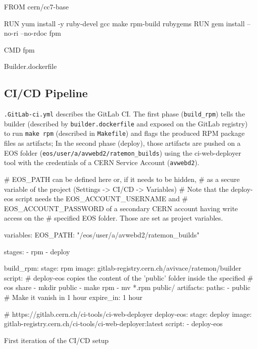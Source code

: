 \begin{listing}[ht]
\begin{yamlcode}
FROM cern/cc7-base

RUN yum install -y ruby-devel gcc make rpm-build rubygems
RUN gem install --no-ri --no-rdoc fpm

CMD fpm
\end{yamlcode}
\caption{Builder.dockerfile}
\end{listing}


\subsection{CI/CD Pipeline}

\texttt{.GitLab-ci.yml} describes the GitLab CI. The first phase (\texttt{build\_rpm}) tells the builder (described by \texttt{builder.dockerfile} and exposed on the GitLab registry) to run \texttt{make rpm} (described in \texttt{Makefile}) and flags the produced RPM package files as artifacts; In the second phase (deploy), those artifacts are pushed on a EOS folder (\texttt{\/eos/user/a/avwebd2/ratemon\_builds}) using the ci-web-deployer tool with the credentials of a CERN Service Account (\texttt{avwebd2}).


\begin{listing}[ht]
\begin{yamlcode}

# EOS_PATH can be defined here or, if it needs to be hidden, 
# as a secure variable of the project (Settings -> CI/CD -> Variables)
# Note that the deploy-eos script needs the EOS_ACCOUNT_USERNAME and 
# EOS_ACCOUNT_PASSWORD of a secondary CERN account having write access on the
# specified EOS folder. Those are set as project variables.

variables:
  EOS_PATH: "/eos/user/a/avwebd2/ratemon_builds"

stages:
  - rpm
  - deploy

build_rpm:
  stage: rpm
  image: gitlab-registry.cern.ch/avivace/ratemon/builder
  script:
    # deploy-eos copies the content of the 'public' folder inside the specified
    # eos share
    - mkdir public
    - make rpm
    - mv *.rpm public/
  artifacts:
    paths:
      - public
    # Make it vanish in 1 hour
    expire_in: 1 hour

# https://gitlab.cern.ch/ci-tools/ci-web-deployer
deploy-eos:
  stage: deploy
  image: gitlab-registry.cern.ch/ci-tools/ci-web-deployer:latest
  script:
    - deploy-eos

\end{yamlcode}
\caption{First iteration of the CI/CD setup}
\end{listing}

